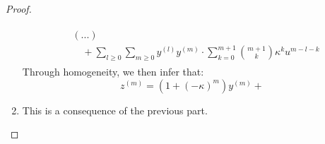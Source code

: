 \begin{proof}
\begin{enumerate}
$$\begin{aligned}
                                    \begin{aligned}
                                        & (...)
                                        \\
                                        & \quad + \sum_{l \geq 0} \sum_{m \geq 0} y^{(l)} y^{(m)} \cdot \sum_{k = 0}^{m + 1} \binom{m + 1}{k} \kappa^k u^{m - l - k}
                                    \end{aligned}
                                \end{aligned}
                            $$
                        Through homogeneity, we then infer that:
                            $$z^{(m)} = (1 + (-\kappa)^m) y^{(m)} + $$
                        \item This is a consequence of the previous part.
                    \end{enumerate}
                \end{proof}
                
